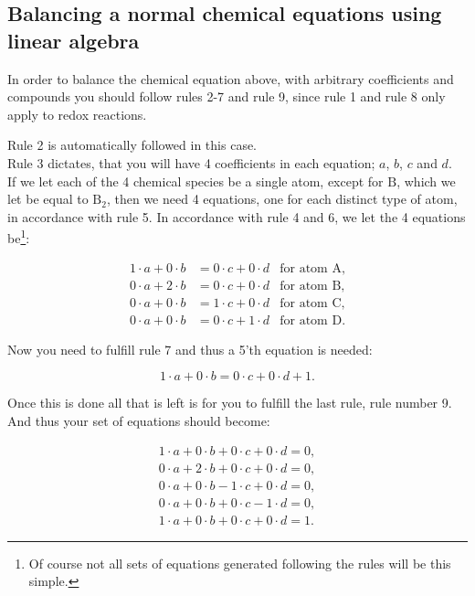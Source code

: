 \documentclass[a4paper]{article}
\begin{document}
\subsection{Balancing a normal chemical equations using linear algebra}

In order to balance the chemical equation above, with arbitrary coefficients and compounds you should follow rules 2-7 and rule 9, since rule 1 and rule 8 only apply to redox reactions.

Rule 2 is automatically followed in this case.\\
Rule 3 dictates, that you will have 4 coefficients in each equation; $a$, $b$, $c$ and $d$.\\
If we let each of the 4 chemical species be a single atom, except for $\text{B}$, which we let be equal to $\text{B}_2$, then we need 4 equations, one for each distinct type of atom, in accordance with rule 5. In accordance with rule 4 and 6, we let the 4 equations be\footnote{Of course not all sets of equations generated following the rules will be this simple.}:

\begin{align*}
	1 \cdot a + 0 \cdot b &= 0 \cdot c + 0 \cdot d & \text{for atom $\text{A}$},\\
	0 \cdot a + 2 \cdot b &= 0 \cdot c + 0 \cdot d & \text{for atom $\text{B}$},\\
	0 \cdot a + 0 \cdot b &= 1 \cdot c + 0 \cdot d & \text{for atom $\text{C}$},\\
	0 \cdot a + 0 \cdot b &= 0 \cdot c + 1 \cdot d & \text{for atom $\text{D}$}.
\end{align*}

Now you need to fulfill rule 7 and thus a 5'th equation is needed:

$$1 \cdot a + 0 \cdot b = 0 \cdot c + 0 \cdot d + 1.$$

Once this is done all that is left is for you to fulfill the last rule, rule number 9. And thus your set of equations should become:

\begin{align*}
	1 \cdot a + 0 \cdot b + 0 \cdot c + 0 \cdot d = 0,\\
	0 \cdot a + 2 \cdot b + 0 \cdot c + 0 \cdot d = 0,\\
	0 \cdot a + 0 \cdot b - 1 \cdot c + 0 \cdot d = 0,\\
	0 \cdot a + 0 \cdot b + 0 \cdot c - 1 \cdot d = 0,\\
	1 \cdot a + 0 \cdot b + 0 \cdot c + 0 \cdot d = 1.
\end{align*}
\end{document}
